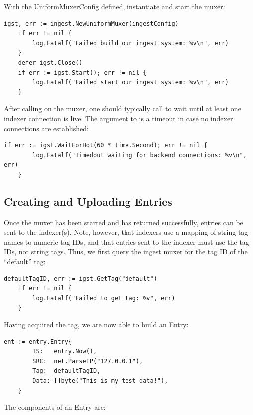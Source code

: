 With the UniformMuxerConfig defined, instantiate and start the muxer:

\begin{Verbatim}[breaklines=true]
    igst, err := ingest.NewUniformMuxer(ingestConfig)
    if err != nil {
        log.Fatalf("Failed build our ingest system: %v\n", err)
    }
    defer igst.Close()
    if err := igst.Start(); err != nil {
        log.Fatalf("Failed start our ingest system: %v\n", err)
    }
\end{Verbatim}


After calling  on the muxer, one should typically call
 to wait until at least one indexer connection is live.
The argument to  is a timeout in case no indexer
connections are established:

\begin{Verbatim}[breaklines=true]
    if err := igst.WaitForHot(60 * time.Second); err != nil {
        log.Fatalf("Timedout waiting for backend connections: %v\n", err)
    }
\end{Verbatim}


\subsection{Creating and Uploading Entries}
Once the muxer has been started and  has returned
successfully, entries can be sent to the indexer(s). Note, however, that
indexers use a mapping of string tag names to numeric tag IDs, and that
entries sent to the indexer must use the  tag IDs, not string
tags. Thus, we first query the ingest muxer for the tag ID of the
``default'' tag:

\begin{Verbatim}[breaklines=true]
    defaultTagID, err := igst.GetTag("default")
    if err != nil {
        log.Fatalf("Failed to get tag: %v", err)
    }
\end{Verbatim}

Having acquired the tag, we are now able to build an Entry:

\begin{Verbatim}[breaklines=true]
    ent := entry.Entry{
        TS:   entry.Now(),
        SRC:  net.ParseIP("127.0.0.1"),
        Tag:  defaultTagID,
        Data: []byte("This is my test data!"),
    }

\end{Verbatim}


The components of an Entry are:

